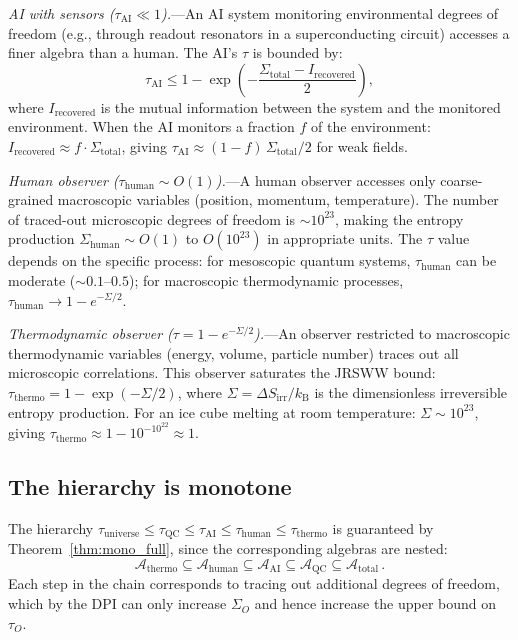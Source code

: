 \documentclass[aps,prd,preprint,superscriptaddress,longbibliography]{revtex4-2}
\newcommand{\kB}{k_{\mathrm{B}}}
\newcommand{\tauasym}{\tau}
\newcommand{\algO}{\mathcal{A}}
\begin{document}
\emph{AI with sensors ($\tauasym_{\mathrm{AI}} \ll 1$).}---An AI
system monitoring environmental degrees of freedom (e.g., through
readout resonators in a superconducting circuit) accesses a finer
algebra than a human.  The AI's $\tauasym$ is bounded by:
\begin{equation}
  \tauasym_{\mathrm{AI}} \leq 1 -
  \exp\!\left(-\frac{\Sigma_{\mathrm{total}} - I_{\mathrm{recovered}}}{2}\right),
  \label{eq:tau_AI}
\end{equation}
where $I_{\mathrm{recovered}}$ is the mutual information between the
system and the monitored environment.  When the AI monitors a
fraction $f$ of the environment:
$I_{\mathrm{recovered}} \approx f\cdot\Sigma_{\mathrm{total}}$,
giving $\tauasym_{\mathrm{AI}} \approx (1-f)\,\Sigma_{\mathrm{total}}/2$
for weak fields.

\emph{Human observer ($\tauasym_{\mathrm{human}} \sim O(1)$).}---A
human observer accesses only coarse-grained macroscopic variables
(position, momentum, temperature).  The number of traced-out
microscopic degrees of freedom is $\sim 10^{23}$, making the entropy
production $\Sigma_{\mathrm{human}} \sim O(1)$ to $O(10^{23})$
in appropriate units.  The $\tauasym$ value depends on the specific
process: for mesoscopic quantum systems, $\tauasym_{\mathrm{human}}$
can be moderate ($\sim 0.1$--$0.5$); for macroscopic thermodynamic
processes, $\tauasym_{\mathrm{human}} \to 1 - e^{-\Sigma/2}$.

\emph{Thermodynamic observer ($\tauasym = 1 - e^{-\Sigma/2}$).}---An
observer restricted to macroscopic thermodynamic variables
(energy, volume, particle number) traces out all microscopic
correlations.  This observer saturates the JRSWW bound:
$\tauasym_{\mathrm{thermo}} = 1 - \exp(-\Sigma/2)$, where
$\Sigma = \Delta S_{\mathrm{irr}}/\kB$ is the dimensionless
irreversible entropy production.  For an ice cube melting at room
temperature: $\Sigma \sim 10^{23}$, giving
$\tauasym_{\mathrm{thermo}} \approx 1 - 10^{-10^{22}} \approx 1$.

\subsection{The hierarchy is monotone}

The hierarchy $\tauasym_{\mathrm{universe}} \leq
\tauasym_{\mathrm{QC}} \leq \tauasym_{\mathrm{AI}} \leq
\tauasym_{\mathrm{human}} \leq \tauasym_{\mathrm{thermo}}$ is
guaranteed by Theorem~\ref{thm:mono_full}, since the corresponding
algebras are nested:
\begin{equation}
  \algO_{\mathrm{thermo}} \subseteq \algO_{\mathrm{human}} \subseteq
  \algO_{\mathrm{AI}} \subseteq \algO_{\mathrm{QC}} \subseteq
  \algO_{\mathrm{total}}\,.
  \label{eq:algebra_chain}
\end{equation}
Each step in the chain corresponds to tracing out additional degrees
of freedom, which by the DPI can only increase $\Sigma_O$ and hence
increase the upper bound on $\tauasym_O$.
\end{document}
